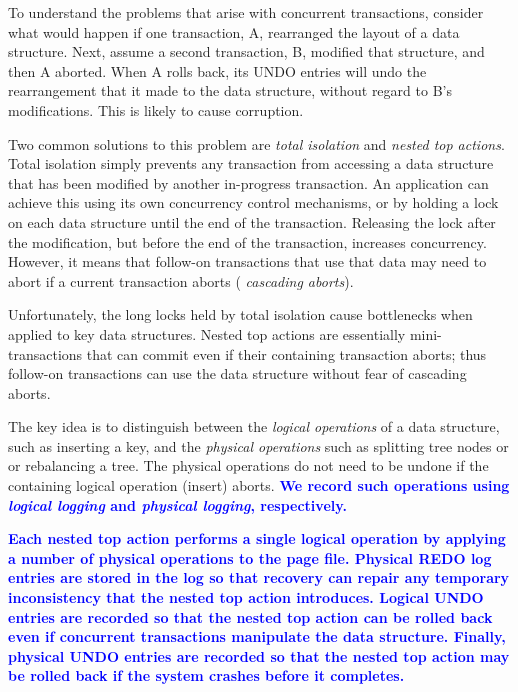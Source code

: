 \documentclass[letterpaper,twocolumn,10pt]{article}
\newcommand{\diff}[1]{\textcolor{blue}{\bf #1}}
\begin{document}
To understand the problems that arise with concurrent transactions,
consider what would happen if one transaction, A, rearranged the
layout of a data structure.  Next, assume a second transaction, B,
modified that structure, and then A aborted.  When A rolls back, its
UNDO entries will undo the rearrangement that it made to the data
structure, without regard to B's modifications.  This is likely to
cause corruption.

Two common solutions to this problem are {\em total isolation} and
{\em nested top actions}.  Total isolation simply prevents any
transaction from accessing a data structure that has been modified by
another in-progress transaction.  An application can achieve this
using its own concurrency control mechanisms, or by holding a lock on
each data structure until the end of the transaction.  Releasing the
lock after the modification, but before the end of the transaction,
increases concurrency.  However, it means that follow-on transactions that use
that data may need to abort if a current transaction aborts ({\em
cascading aborts}).  %

Unfortunately, the long locks held by total isolation cause bottlenecks when applied to key
data structures.
Nested top actions are essentially mini-transactions that can
commit even if their containing transaction aborts; thus follow-on
transactions can use the data structure without fear of cascading
aborts.  

The key idea is to distinguish between the {\em logical operations} of a
data structure, such as inserting a key, and the {\em physical operations}
such as splitting tree nodes or or rebalancing a tree. The physical
operations do not need to be undone if the containing logical operation
(insert) aborts.  \diff{We record such operations using {\em logical 
logging} and {\em physical logging}, respectively.}

\diff{Each nested top action performs a single logical operation by applying
a number of physical operations to the page file.  Physical REDO log
entries are stored in the log so that recovery can repair any
temporary inconsistency that the nested top action introduces.
Logical UNDO entries are recorded so that the nested top action can be
rolled back even if concurrent transactions manipulate the data
structure.  Finally, physical UNDO entries are recorded so that 
the nested top action may be rolled back if the system crashes before 
it completes.}
\end{document}
